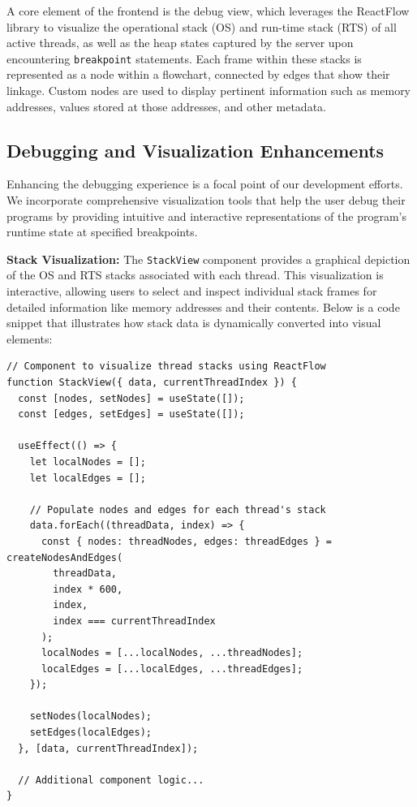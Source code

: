 \documentclass{report}
\begin{document}
A core element of the frontend is the debug view, which leverages the ReactFlow library to visualize the operational stack (OS) and run-time stack (RTS) of all active threads, as well as the heap states captured by the server upon encountering \texttt{breakpoint} statements. Each frame within these stacks is represented as a node within a flowchart, connected by edges that show their linkage. Custom nodes are used to display pertinent information such as memory addresses, values stored at those addresses, and other metadata.

\subsection{Debugging and Visualization Enhancements}

Enhancing the debugging experience is a focal point of our development efforts. We incorporate comprehensive visualization tools that help the user debug their programs by providing intuitive and interactive representations of the program's runtime state at specified breakpoints.

\textbf{Stack Visualization:}
The \texttt{StackView} component provides a graphical depiction of the OS and RTS stacks associated with each thread. This visualization is interactive, allowing users to select and inspect individual stack frames for detailed information like memory addresses and their contents. Below is a code snippet that illustrates how stack data is dynamically converted into visual elements:

\begin{verbatim}
// Component to visualize thread stacks using ReactFlow
function StackView({ data, currentThreadIndex }) {
  const [nodes, setNodes] = useState([]);
  const [edges, setEdges] = useState([]);

  useEffect(() => {
    let localNodes = [];
    let localEdges = [];

    // Populate nodes and edges for each thread's stack
    data.forEach((threadData, index) => {
      const { nodes: threadNodes, edges: threadEdges } = createNodesAndEdges(
        threadData,
        index * 600,
        index,
        index === currentThreadIndex
      );
      localNodes = [...localNodes, ...threadNodes];
      localEdges = [...localEdges, ...threadEdges];
    });

    setNodes(localNodes);
    setEdges(localEdges);
  }, [data, currentThreadIndex]);

  // Additional component logic...
}
\end{verbatim}
\end{document}
